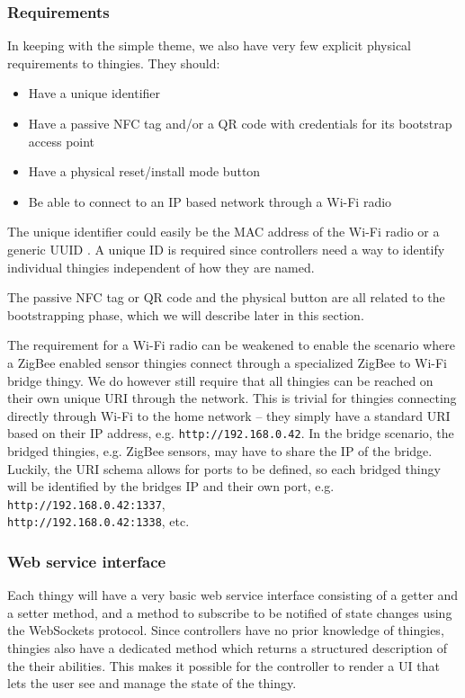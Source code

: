 \documentclass{ubicomp2012}
\begin{document}
\subsubsection{Requirements}

In keeping with the simple theme, we also have very few explicit physical requirements to thingies. They should:

\begin{itemize}
\item Have a unique identifier
\item Have a passive NFC tag and/or a QR code with credentials for its bootstrap access point
\item Have a physical reset/install mode button
\item Be able to connect to an IP based network through a Wi-Fi radio
\end{itemize}

The unique identifier could easily be the MAC address of the Wi-Fi radio or a generic UUID \cite{Leach2005}. A unique ID is required since controllers need a way to identify individual thingies independent of how they are named.

The passive NFC tag or QR code and the physical button are all related to the bootstrapping phase, which we will describe later in this section.

The requirement for a Wi-Fi radio can be weakened to enable the scenario where a ZigBee enabled sensor thingies connect through a specialized ZigBee to Wi-Fi bridge thingy. We do however still require that all thingies can be reached on their own unique URI through the network. This is trivial for thingies connecting directly through Wi-Fi to the home network -- they simply have a standard URI \cite{uri-rfc} based on their IP address, e.g. \texttt{http://192.168.0.42}. In the bridge scenario, the bridged thingies, e.g. ZigBee sensors, may have to share the IP of the bridge. Luckily, the URI schema allows for ports to be defined, so each bridged thingy will be identified by the bridges IP and their own port, e.g. \lstinline{http://192.168.0.42:1337},\\\lstinline{http://192.168.0.42:1338}, etc.

\subsubsection{Web service interface}

Each thingy will have a very basic web service interface consisting of a getter and a setter method, and a method to subscribe to be notified of state changes using the WebSockets protocol. Since controllers have no prior knowledge of thingies, thingies also have a dedicated method which returns a structured description of the their abilities. This makes it possible for the controller to render a UI that lets the user see and manage the state of the thingy.
\end{document}
